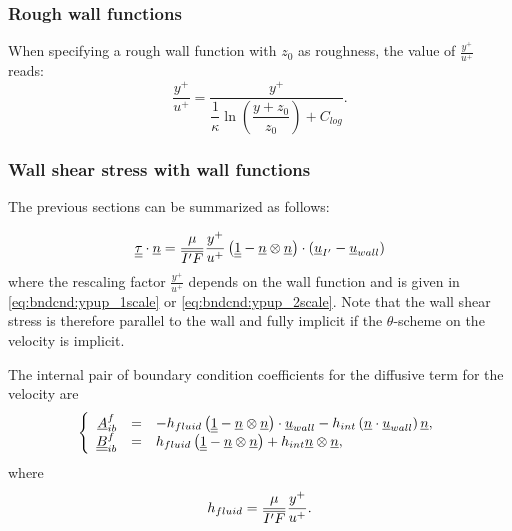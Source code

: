 \subsubsection{Rough wall functions}\label{sec:bndcnd:2velocityscales}
When specifying a rough wall function with $z_0$ as roughness, the value of $\frac{y^+}{u^+}$ reads:
\begin{equation}\label{eq:bndcnd:ypup_rough}
\dfrac{y^+}{u^+} = \dfrac{y^+}{ \dfrac{1}{\kappa} \ln \left( \dfrac{y+z_0}{z_0}\right) + C_{log}}.
\end{equation}



\subsubsection{Wall shear stress with wall functions}
The previous sections can be summarized as follows:

\begin{equation}
\underline{\underline{\tau}} \cdot \underline{n} = \dfrac{\mu}{\overline{{I^\prime} F} } \dfrac{y^+}{u^+} \left(\underline{\underline{1}} - \underline{n} \otimes \underline{n} \right) \cdot \left(\underline{u}_{I^\prime} - \underline{u}_{wall} \right)
\end{equation}
%
where the rescaling factor $\frac{y^+}{u^+}$ depends on the wall function and is given in \eqref{eq:bndcnd:ypup_1scale} or \eqref{eq:bndcnd:ypup_2scale}. Note that the wall shear stress is therefore parallel to the wall and fully implicit if the $\theta$-scheme on the velocity is implicit.

The internal pair of boundary condition coefficients for the diffusive term for the velocity are
\begin{equation}\label{eq:bndcnd:boundary_condition_wall_function}
\left\lbrace
\begin{array}{r c l}
\underline{A}^f_{ib} & = & -h_{fluid}  \left(\underline{\underline{1}} - \underline{n} \otimes \underline{n} \right) \cdot  \underline{u}_{wall}
 - h_{int} \left( \underline{n} \cdot \underline{u}_{wall}  \right) \underline{n}
, \\
\underline{\underline{B}}^f_{ib} & = & h_{fluid}  \left(\underline{\underline{1}} - \underline{n} \otimes \underline{n} \right)
+ h_{int} \underline{n} \otimes \underline{n}
,
\end{array}
\right.
\end{equation}
where
\begin{equation}
h_{fluid} = \dfrac{\mu}{\overline{{I^\prime} F} } \dfrac{y^+}{u^+}.
\end{equation}

